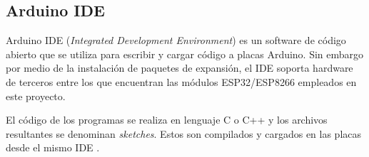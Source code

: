 %

\subsection{Arduino IDE}
\label{sec:Arduino IDE}

Arduino IDE (\textit{Integrated Development Environment}) es un software de código abierto que se utiliza para escribir y cargar código a placas Arduino. Sin embargo por medio de la instalación de paquetes de expansión, el IDE soporta hardware de terceros entre los que encuentran las módulos ESP32/ESP8266 \citep{Arduinosupport} empleados en este proyecto.

El código de los programas se realiza en lenguaje C o C++ y los archivos resultantes se denominan \textit{sketches}. Estos son compilados y cargados en las placas desde el mismo IDE \citep{arduinoide}.

